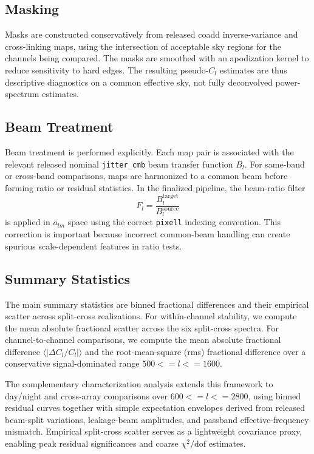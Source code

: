 \documentclass[twocolumn,showpacs,preprintnumbers,amsmath,amssymb,floatfix,prd]{revtex4-2}
\def\ell{l}%
\def\le{<=}%
\begin{document}
\subsection{Masking}\label{sec:mask}

Masks are constructed conservatively from released coadd inverse-variance and cross-linking maps, using the intersection of acceptable sky regions for the channels being compared.
The masks are smoothed with an apodization kernel to reduce sensitivity to hard edges.
The resulting pseudo-$C_\ell$ estimates are thus descriptive diagnostics on a common effective sky, not fully deconvolved power-spectrum estimates.

\subsection{Beam Treatment}\label{sec:beam}

Beam treatment is performed explicitly.
Each map pair is associated with the relevant released nominal \texttt{jitter\_cmb} beam transfer function $B_\ell$.
For same-band or cross-band comparisons, maps are harmonized to a common beam before forming ratio or residual statistics.
In the finalized pipeline, the beam-ratio filter
\begin{equation}
F_\ell = \frac{B_\ell^\mathrm{target}}{B_\ell^\mathrm{source}}
\end{equation}
is applied in $a_{\ell m}$ space using the correct \texttt{pixell} indexing convention.
This correction is important because incorrect common-beam handling can create spurious scale-dependent features in ratio tests.

\subsection{Summary Statistics}\label{sec:stats}

The main summary statistics are binned fractional differences and their empirical scatter across split-cross realizations.
For within-channel stability, we compute the mean absolute fractional scatter across the six split-cross spectra.
For channel-to-channel comparisons, we compute the mean absolute fractional difference $\langle |\Delta C_\ell / C_\ell| \rangle$ and the root-mean-square (rms) fractional difference over a conservative signal-dominated range $500 \le \ell \le 1600$.

The complementary characterization analysis extends this framework to day/night and cross-array comparisons over $600 \le \ell \le 2800$, using binned residual curves together with simple expectation envelopes derived from released beam-split variations, leakage-beam amplitudes, and passband effective-frequency mismatch.
Empirical split-cross scatter serves as a lightweight covariance proxy, enabling peak residual significances and coarse $\chi^2/\mathrm{dof}$ estimates.
\end{document}

